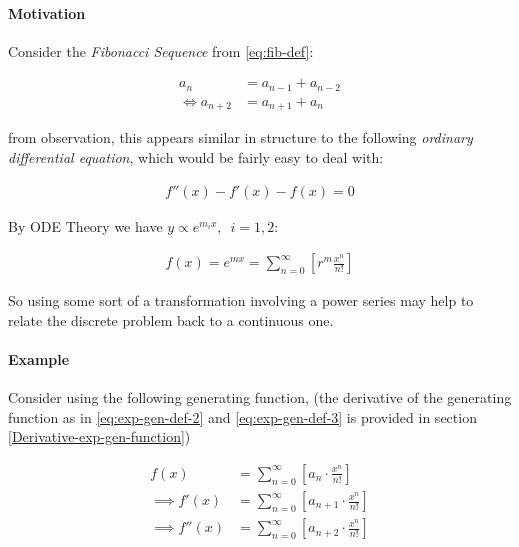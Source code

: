 \documentclass[11pt]{article}
\begin{document}
\paragraph{Motivation}
\label{motivation}
Consider the \emph{Fibonacci Sequence} from \eqref{eq:fib-def}:


\begin{align}
    a_{n}&= a_{n - 1} + a_{n - 2} \nonumber \\
\iff a_{n+  2} &= a_{n+  1} +  a_n \label{eq:fib-def-shift}
\end{align}


from observation, this appears similar in structure to the following \emph{ordinary
differential equation}, which would be fairly easy to deal with:


\begin{align*}
f''\left( x \right)- f'\left( x \right)- f\left( x \right)=  0
\end{align*}

By ODE Theory we have \(y \propto e^{m_{i}x}, \enspace i = 1, 2\):

\begin{align*}
f\left( x \right)= e^{mx} = \sum^{\infty}_{n= 0}   \left[ r^{m} \frac{x^n}{n!} \right]
\end{align*}

So using some sort of a transformation involving a power series may help to
relate the discrete problem back to a continuous one.

\paragraph{Example}
\label{solving-the-sequence}
Consider using the following generating function, (the derivative of the
generating function as in \eqref{eq:exp-gen-def-2} and \eqref{eq:exp-gen-def-3} is
provided in section \ref{Derivative-exp-gen-function})




\begin{align}
    f\left( x \right) &=  \sum^{\infty}_{n= 0}   \left[ a_{n} \cdot  \frac{x^n}{n!} \right]   \label{eq:exp-gen-def-1} \\
 \implies   f'\left( x \right) &=  \sum^{\infty}_{n= 0}   \left[ a_{n+1} \cdot  \frac{x^n}{n!} \right]   \label{eq:exp-gen-def-2} \\
\implies    f''\left( x \right) &=  \sum^{\infty}_{n= 0}   \left[ a_{n+2} \cdot  \frac{x^n}{n!} \right]   \label{eq:exp-gen-def-3}
\end{align}
\end{document}

